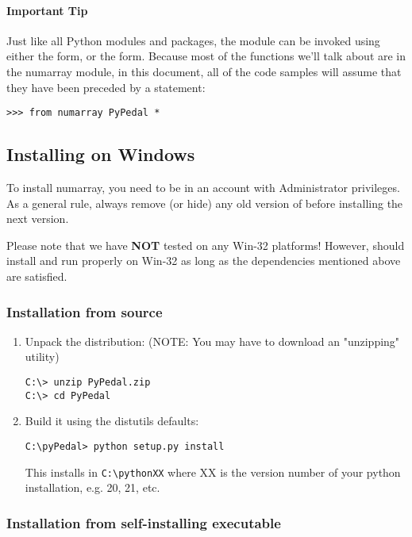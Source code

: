 \paragraph*{Important Tip} \label{sec:tip:from-pypedal-import} Just like all Python modules and packages, the \PYPEDAL{} module can be invoked using either the  form, or the  form.  Because most of the functions we'll talk about are in the numarray module, in this document, all of the code samples will assume that they have been preceded
by a statement:
\begin{verbatim}
>>> from numarray PyPedal *
\end{verbatim}


\subsection{Installing on Windows}
\label{sec:installing-windows}

To install numarray, you need to be in an account with Administrator privileges.  As a general rule, always remove (or hide) any old version of \PYPEDAL{} before installing the next version.

Please note that we have \textbf{NOT} tested \PYPEDAL{} on any Win-32 platforms!  However, \PYPEDAL{} should install and run properly on Win-32 as long as the dependencies mentioned above are satisfied.


\subsubsection{Installation from source}

\begin{enumerate}
\item Unpack the distribution: (NOTE: You may have to download an "unzipping" utility)
\begin{verbatim}
C:\> unzip PyPedal.zip 
C:\> cd PyPedal
\end{verbatim}
\item Build it using the distutils defaults:
\begin{verbatim}
C:\pyPedal> python setup.py install
\end{verbatim}
This installs \PYPEDAL{} in \texttt{C:\textbackslash{}pythonXX} where XX is the version number of your python installation, e.g. 20, 21, etc.
\end{enumerate}

\subsubsection{Installation from self-installing executable}

